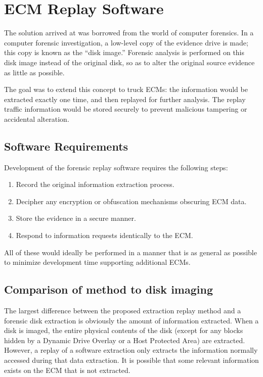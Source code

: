 \chapter{ECM Replay Software}

The solution arrived at was borrowed from the world of computer forensics. In a computer forensic investigation,
a low-level copy of the evidence drive is made; this copy is known as the ``disk image.'' Forensic analysis
is performed on this disk image instead of the original disk, so as to alter the original source evidence as
little as possible.

The goal was to extend this concept to truck ECMs: the information would be extracted exactly one time, and then
replayed for further analysis. The replay traffic information would be stored securely to prevent malicious tampering
or accidental alteration.

\section{Software Requirements}

Development of the forensic replay software requires the following steps:

\begin{enumerate}
  \item Record the original information extraction process.
  \item Decipher any encryption or obfuscation mechanisms obscuring ECM data.
  \item Store the evidence in a secure manner.
  \item Respond to information requests identically to the ECM.
\end{enumerate}

All of these would ideally be performed in a manner that is as general as possible to minimize development time
supporting additional ECMs.

\section{Comparison of method to disk imaging}

The largest difference between the proposed extraction replay method and a forensic disk extraction is obviously
the amount of information extracted. When a disk is imaged, the entire physical contents of the disk (except for
any blocks hidden by a Dynamic Drive Overlay or a Host Protected Area) are extracted. However, a replay of a
software extraction only extracts the information normally accessed during that data  extraction. It is possible
that some relevant information exists on the ECM that is not extracted.

